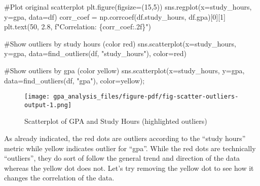 \documentclass[
  letterpaper,
  DIV=11,
  numbers=noendperiod]{scrreprt}
\newenvironment{Shaded}{\begin{snugshade}}{\end{snugshade}}
\newcommand{\CommentTok}[1]{\textcolor[rgb]{0.37,0.37,0.37}{#1}}
\newcommand{\DecValTok}[1]{\textcolor[rgb]{0.68,0.00,0.00}{#1}}
\newcommand{\FloatTok}[1]{\textcolor[rgb]{0.68,0.00,0.00}{#1}}
\newcommand{\NormalTok}[1]{\textcolor[rgb]{0.00,0.23,0.31}{#1}}
\newcommand{\OperatorTok}[1]{\textcolor[rgb]{0.37,0.37,0.37}{#1}}
\newcommand{\SpecialCharTok}[1]{\textcolor[rgb]{0.37,0.37,0.37}{#1}}
\newcommand{\SpecialStringTok}[1]{\textcolor[rgb]{0.13,0.47,0.30}{#1}}
\newcommand{\StringTok}[1]{\textcolor[rgb]{0.13,0.47,0.30}{#1}}
\begin{document}
\begin{Shaded}
\begin{Highlighting}[]
\CommentTok{\#Plot original scatterplot}
\NormalTok{plt.figure(figsize}\OperatorTok{=}\NormalTok{(}\DecValTok{15}\NormalTok{,}\DecValTok{5}\NormalTok{))}
\NormalTok{sns.regplot(x}\OperatorTok{=}\StringTok{\textquotesingle{}study\_hours\textquotesingle{}}\NormalTok{, y}\OperatorTok{=}\StringTok{\textquotesingle{}gpa\textquotesingle{}}\NormalTok{, data}\OperatorTok{=}\NormalTok{df)}
\NormalTok{corr\_coef }\OperatorTok{=}\NormalTok{ np.corrcoef(df.study\_hours, df.gpa)[}\DecValTok{0}\NormalTok{][}\DecValTok{1}\NormalTok{]}
\NormalTok{plt.text(}\DecValTok{50}\NormalTok{, }\FloatTok{2.8}\NormalTok{, }\SpecialStringTok{f"Correlation: }\SpecialCharTok{\{}\NormalTok{corr\_coef}\SpecialCharTok{:.2f\}}\SpecialStringTok{"}\NormalTok{)}

\CommentTok{\#Show outliers by study hours (color red)}
\NormalTok{sns.scatterplot(x}\OperatorTok{=}\StringTok{\textquotesingle{}study\_hours\textquotesingle{}}\NormalTok{, y}\OperatorTok{=}\StringTok{\textquotesingle{}gpa\textquotesingle{}}\NormalTok{, data}\OperatorTok{=}\NormalTok{find\_outliers(df, }\StringTok{"study\_hours"}\NormalTok{), color}\OperatorTok{=}\StringTok{\textquotesingle{}red\textquotesingle{}}\NormalTok{)}

\CommentTok{\#Show outliers by gpa (color yellow)}
\NormalTok{sns.scatterplot(x}\OperatorTok{=}\StringTok{\textquotesingle{}study\_hours\textquotesingle{}}\NormalTok{, y}\OperatorTok{=}\StringTok{\textquotesingle{}gpa\textquotesingle{}}\NormalTok{, data}\OperatorTok{=}\NormalTok{find\_outliers(df, }\StringTok{"gpa"}\NormalTok{), color}\OperatorTok{=}\StringTok{\textquotesingle{}yellow\textquotesingle{}}\NormalTok{)}\OperatorTok{;}
\end{Highlighting}
\end{Shaded}

\begin{figure}[H]

{\centering \texttt{[image: gpa\_analysis\_files/figure-pdf/fig-scatter-outliers-output-1.png]}

}

\caption{\label{fig-scatter-outliers}Scatterplot of GPA and Study Hours
(highlighted outliers)}

\end{figure}

As already indicated, the red dots are outliers according to the ``study
hours'' metric while yellow indicates outlier for ``gpa''. While the red
dots are technically ``outliers'', they do sort of follow the general
trend and direction of the data whereas the yellow dot does not. Let's
try removing the yellow dot to see how it changes the correlation of the
data.
\end{document}
